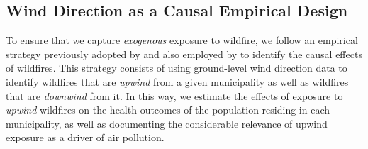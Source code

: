 \documentclass[11pt]{article}
\begin{document}
\begin{spacing}{1.5}
\subsection{Wind Direction as a Causal Empirical Design}
\label{sscn:design}
To ensure that we capture \emph{exogenous} exposure to wildfire, we follow an empirical strategy previously adopted by \cite{RangelVogl2019} and also employed by \cite{graffzivin2020unintended} to identify the causal effects of wildfires. This strategy consists of using ground-level wind direction data to identify wildfires that are \textit{upwind} from a given municipality as well as wildfires that are \textit{downwind} from it. In this way, we estimate the effects of exposure to \textit{upwind} wildfires on the health outcomes of the population residing in each municipality, as well as documenting the considerable relevance of upwind exposure as a driver of air pollution.  







\end{spacing}
\end{document}
